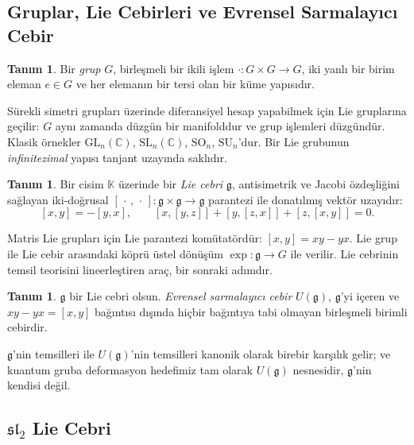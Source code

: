 \documentclass[10pt]{math}
\numberwithin{equation}{section}
\theoremstyle{plain}
\theoremstyle{definition}
\newtheorem{definition}[theorem]{Tanım}
\renewcommand{\sl}{\mathfrak{sl}}
\newcommand{\gfrak}{\mathfrak{g}}
\newcommand{\K}{\mathbb{K}}
\newcommand{\C}{\mathbb{C}}
\newcommand{\GL}{\mathrm{GL}}
\newcommand{\SL}{\mathrm{SL}}
\begin{document}
\subsection{Gruplar, Lie Cebirleri ve Evrensel Sarmalayıcı Cebir}

\begin{definition}
Bir \emph{grup} $G$, birleşmeli bir ikili işlem $\cdot : G \times G \to G$,
iki yanlı bir birim eleman $e \in G$ ve her elemanın bir tersi olan bir
küme yapısıdır.
\end{definition}

Sürekli simetri grupları üzerinde diferansiyel hesap yapabilmek için Lie
gruplarına geçilir: $G$ aynı zamanda düzgün bir manifolddur ve grup
işlemleri düzgündür. Klasik örnekler $\GL_n(\C)$, $\SL_n(\C)$,
$\mathrm{SO}_n$, $\mathrm{SU}_n$'dur. Bir Lie grubunun \emph{infinitezimal}
yapısı tanjant uzayında saklıdır.

\begin{definition}
Bir cisim $\K$ üzerinde bir \emph{Lie cebri} $\gfrak$, antisimetrik ve Jacobi
özdeşliğini sağlayan iki-doğrusal $[\,\cdot\,,\,\cdot\,] : \gfrak \times \gfrak \to \gfrak$
parantezi ile donatılmış vektör uzayıdır:
\[
  [x,y] = -[y,x], \qquad
  [x,[y,z]] + [y,[z,x]] + [z,[x,y]] = 0.
\]
\end{definition}

Matris Lie grupları için Lie parantezi komütatördür: $[x,y] = xy - yx$.
Lie grup ile Lie cebir arasındaki köprü üstel dönüşüm $\exp : \gfrak \to G$ ile
verilir. Lie cebrinin temsil teorisini lineerleştiren araç, bir sonraki
adımdır.

\begin{definition}
$\gfrak$ bir Lie cebri olsun. \emph{Evrensel sarmalayıcı cebir} $U(\gfrak)$,
$\gfrak$'yi içeren ve $xy - yx = [x,y]$ bağıntısı dışında hiçbir bağıntıya
tabi olmayan birleşmeli birimli cebirdir.
\end{definition}

$\gfrak$'nin temsilleri ile $U(\gfrak)$'nin temsilleri kanonik olarak birebir
karşılık gelir; ve kuantum gruba deformasyon hedefimiz tam olarak $U(\gfrak)$
nesnesidir, $\gfrak$'nin kendisi değil.

\subsection{$\sl_2$ Lie Cebri}
\end{document}
